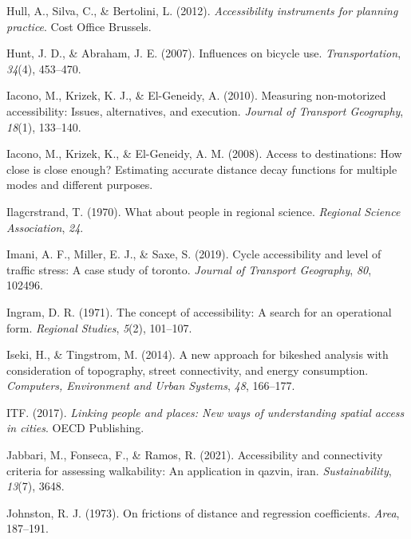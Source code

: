 \documentclass[
11pt, %
oneside, %
english, %
singlespacing, %
]{macthesis} %
\newlength{\cslhangindent}
\newenvironment{CSLReferences}[2] %
 {%
  \setlength{\parindent}{0pt}
  \ifodd #1 \everypar{\setlength{\hangindent}{\cslhangindent}}\ignorespaces\fi
  \ifnum #2 > 0
  \setlength{\parskip}{#2\baselineskip}
  \fi
 }%
 {}
\begin{document}
\begin{CSLReferences}{1}{0}
Hull, A., Silva, C., \& Bertolini, L. (2012). \emph{Accessibility instruments for planning practice}. Cost Office Brussels.

Hunt, J. D., \& Abraham, J. E. (2007). Influences on bicycle use. \emph{Transportation}, \emph{34}(4), 453--470.

Iacono, M., Krizek, K. J., \& El-Geneidy, A. (2010). Measuring non-motorized accessibility: Issues, alternatives, and execution. \emph{Journal of Transport Geography}, \emph{18}(1), 133--140.

Iacono, M., Krizek, K., \& El-Geneidy, A. M. (2008). Access to destinations: How close is close enough? Estimating accurate distance decay functions for multiple modes and different purposes.

Ilagcrstrand, T. (1970). What about people in regional science. \emph{Regional Science Association}, \emph{24}.

Imani, A. F., Miller, E. J., \& Saxe, S. (2019). Cycle accessibility and level of traffic stress: A case study of toronto. \emph{Journal of Transport Geography}, \emph{80}, 102496.

Ingram, D. R. (1971). The concept of accessibility: A search for an operational form. \emph{Regional Studies}, \emph{5}(2), 101--107.

Iseki, H., \& Tingstrom, M. (2014). A new approach for bikeshed analysis with consideration of topography, street connectivity, and energy consumption. \emph{Computers, Environment and Urban Systems}, \emph{48}, 166--177.

ITF. (2017). \emph{Linking people and places: New ways of understanding spatial access in cities}. OECD Publishing.

Jabbari, M., Fonseca, F., \& Ramos, R. (2021). Accessibility and connectivity criteria for assessing walkability: An application in qazvin, iran. \emph{Sustainability}, \emph{13}(7), 3648.

Johnston, R. J. (1973). On frictions of distance and regression coefficients. \emph{Area}, 187--191.


\end{CSLReferences}
\end{document}
